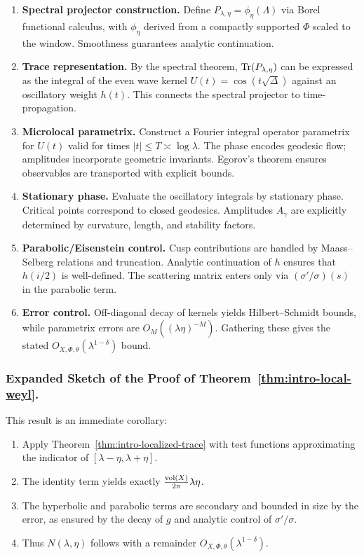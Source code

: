 \begin{enumerate}[label=\arabic*.]
  \item \textbf{Spectral projector construction.} Define $P_{\lambda,\eta}=\phi_\eta(\Lambda)$ via Borel functional calculus, with $\phi_\eta$ derived from a compactly supported $\Phi$ scaled to the window. Smoothness guarantees analytic continuation.

  \item \textbf{Trace representation.} By the spectral theorem, $\operatorname{Tr}(P_{\lambda,\eta})$ can be expressed as the integral of the even wave kernel $U(t)=\cos(t\sqrt{\Delta})$ against an oscillatory weight $h(t)$. This connects the spectral projector to time-propagation.

  \item \textbf{Microlocal parametrix.} Construct a Fourier integral operator parametrix for $U(t)$ valid for times $|t|\le T\asymp\log\lambda$. The phase encodes geodesic flow; amplitudes incorporate geometric invariants. Egorov’s theorem ensures observables are transported with explicit bounds.

  \item \textbf{Stationary phase.} Evaluate the oscillatory integrals by stationary phase. Critical points correspond to closed geodesics. Amplitudes $A_\gamma$ are explicitly determined by curvature, length, and stability factors.

  \item \textbf{Parabolic/Eisenstein control.} Cusp contributions are handled by Maass–Selberg relations and truncation. Analytic continuation of $h$ ensures that $h(i/2)$ is well-defined. The scattering matrix enters only via $(\sigma'/\sigma)(s)$ in the parabolic term.

  \item \textbf{Error control.} Off-diagonal decay of kernels yields Hilbert–Schmidt bounds, while parametrix errors are $O_M((\lambda\eta)^{-M})$. Gathering these gives the stated $O_{X,\Phi,\theta}(\lambda^{1-\delta})$ bound.
\end{enumerate}

\medskip

\subsubsection*{Expanded Sketch of the Proof of Theorem~\ref{thm:intro-local-weyl}.}
This result is an immediate corollary:

\begin{enumerate}[label=\arabic*.]
  \item Apply Theorem~\ref{thm:intro-localized-trace} with test functions approximating the indicator of $[\lambda-\eta,\lambda+\eta]$.
  \item The identity term yields exactly $\frac{\operatorname{vol}(X)}{2\pi}\lambda\eta$.
  \item The hyperbolic and parabolic terms are secondary and bounded in size by the error, as ensured by the decay of $g$ and analytic control of $\sigma'/\sigma$.
  \item Thus $N(\lambda,\eta)$ follows with a remainder $O_{X,\Phi,\theta}(\lambda^{1-\delta})$.
\end{enumerate}

